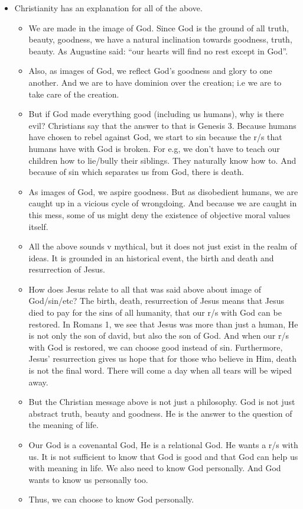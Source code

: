 \begin{itemize}
  \item Christianity has an explanation for all of the above.
  \begin{itemize}
    \item We are made in the image of God. Since God is the ground of all truth, beauty, goodness, we have a natural inclination towards goodness, truth, beauty. As Augustine said: “our hearts will find no rest except in God”.
    \item Also, as images of God, we reflect God’s goodness and glory to one another. And we are to have dominion over the creation; i.e we are to take care of the creation.
    \item But if God made everything good (including us humans), why is there evil? Christians say that the answer to that is Genesis 3. Because humans have chosen to rebel against God, we start to sin because the r/s that humans have with God is broken. For e.g, we don’t have to teach our children how to lie/bully their siblings. They naturally know how to. And because of sin which separates us from God, there is death.
    \item As images of God, we aspire goodness. But as disobedient humans, we are caught up in a vicious cycle of wrongdoing. And because we are caught in this mess, some of us might deny the existence of objective moral values itself.
    \item All the above sounds v mythical, but it does not just exist in the realm of ideas.  It is grounded in an historical event, the birth and death and resurrection of Jesus.
    \item How does Jesus relate to all that was said above about image of God/sin/etc? The birth, death, resurrection of Jesus means that Jesus died to pay for the sins of all humanity, that our r/s with God can be restored. In Romans 1, we see that Jesus was more than just a human, He is not only the son of david, but also the son of God. And when our r/s with God is restored, we can choose good instead of sin. Furthermore, Jesus’ resurrection gives us hope that for those who believe in Him, death is not the final word. There will come a day when all tears will be wiped away.
    \item But the Christian message above is not just a philosophy. God is not just abstract truth, beauty and goodness. He is the answer to the question of the meaning of life.
    \item Our God is a covenantal God, He is a relational God. He wants a r/s with us. It is not sufficient to know that God is good and that God can help us with meaning in life. We also need to know God personally. And God wants to know us personally too.
    \item Thus, we can choose to know God personally.
  \end{itemize}
\end{itemize}